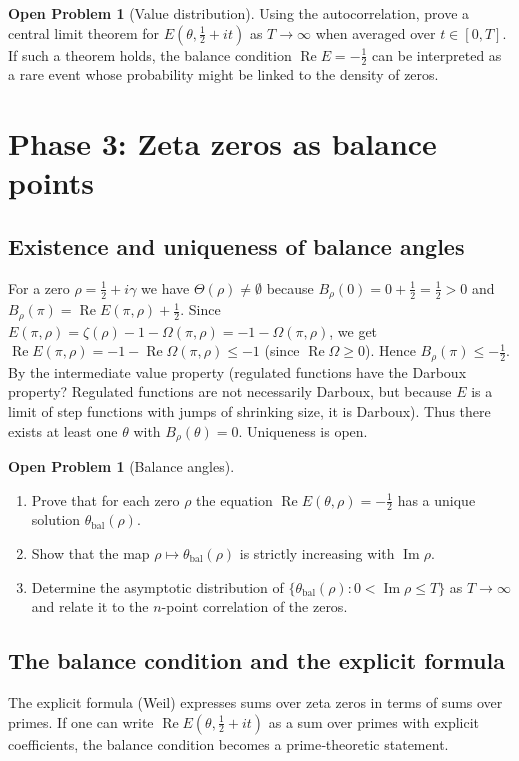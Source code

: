 \documentclass[11pt,a4paper]{article}
\theoremstyle{definition}
\newtheorem{problem}[theorem]{Open Problem}
\theoremstyle{remark}
\begin{document}
\begin{problem}[Value distribution]\label{prob:dist}
Using the autocorrelation, prove a central limit theorem for \(E(\theta,\frac12+it)\) as \(T\to\infty\) when averaged over \(t\in[0,T]\).
If such a theorem holds, the balance condition \(\operatorname{Re}E=-\frac12\) can be interpreted as a rare event whose probability might be linked to the density of zeros.
\end{problem}

\section{Phase 3: Zeta zeros as balance points}
\subsection{Existence and uniqueness of balance angles}
For a zero \(\rho=\frac12+i\gamma\) we have \(\Theta(\rho)\neq\emptyset\) because \(B_\rho(0)=0+\frac12=\frac12>0\) and \(B_\rho(\pi)=\operatorname{Re}E(\pi,\rho)+\frac12\).  Since \(E(\pi,\rho)=\zeta(\rho)-1-\Omega(\pi,\rho) = -1-\Omega(\pi,\rho)\), we get \(\operatorname{Re}E(\pi,\rho) = -1-\operatorname{Re}\Omega(\pi,\rho) \le -1\) (since \(\operatorname{Re}\Omega\ge 0\)).  Hence \(B_\rho(\pi) \le -\frac12\).  By the intermediate value property (regulated functions have the Darboux property? Regulated functions are not necessarily Darboux, but because \(E\) is a limit of step functions with jumps of shrinking size, it is Darboux).  Thus there exists at least one \(\theta\) with \(B_\rho(\theta)=0\).  Uniqueness is open.

\begin{problem}[Balance angles]\label{prob:angles}
\begin{enumerate}[label=(\alph*)]
\item Prove that for each zero \(\rho\) the equation \(\operatorname{Re}E(\theta,\rho)=-\frac12\) has a unique solution \(\theta_{\mathrm{bal}}(\rho)\).
\item Show that the map \(\rho\mapsto\theta_{\mathrm{bal}}(\rho)\) is strictly increasing with \(\operatorname{Im}\rho\).
\item Determine the asymptotic distribution of \(\{\theta_{\mathrm{bal}}(\rho): 0<\operatorname{Im}\rho\le T\}\) as \(T\to\infty\) and relate it to the \(n\)-point correlation of the zeros.
\end{enumerate}
\end{problem}

\subsection{The balance condition and the explicit formula}
The explicit formula (Weil) expresses sums over zeta zeros in terms of sums over primes.
If one can write \(\operatorname{Re}E(\theta,\frac12+it)\) as a sum over primes with explicit coefficients, the balance condition becomes a prime‑theoretic statement.
\end{document}
